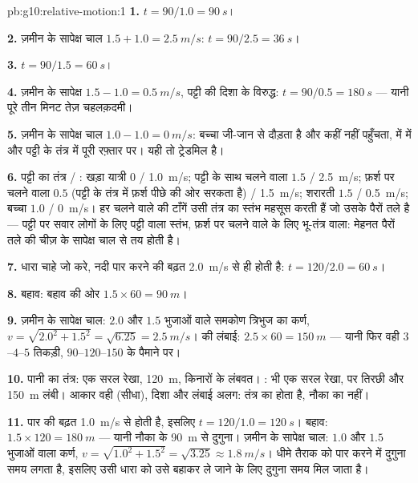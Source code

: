 \begin{solution}{pb:g10:relative-motion:1}
\textbf{1.} $t = 90/1.0 = \qty{90}{s}$।

\textbf{2.} ज़मीन के सापेक्ष चाल $1.5 + 1.0 = \qty{2.5}{m/s}$: $t = 90/2.5 = \qty{36}{s}$।

\textbf{3.} $t = 90/1.5 = \qty{60}{s}$।

\textbf{4.} ज़मीन के सापेक्ष $1.5 - 1.0 = \qty{0.5}{m/s}$, पट्टी की दिशा के विरुद्ध: $t = 90/0.5 = \qty{180}{s}$
--- यानी पूरे तीन मिनट तेज़ चहलक़दमी।

\textbf{5.} ज़मीन के सापेक्ष चाल $1.0 - 1.0 = \qty{0}{m/s}$: बच्चा जी-जान से दौड़ता है और
कहीं नहीं पहुँचता,  में  में और
पट्टी के तंत्र में पूरी रफ़्तार पर। यही तो ट्रेडमिल है।

\textbf{6.} पट्टी का तंत्र / : खड़ा यात्री
$0$ / \qty{1.0}{m/s}; पट्टी के साथ चलने वाला $1.5$ / \qty{2.5}{m/s}; फ़र्श पर
चलने वाला $0.5$ (पट्टी के तंत्र में फ़र्श पीछे की ओर सरकता है) /
\qty{1.5}{m/s}; शरारती $1.5$ / \qty{0.5}{m/s}; बच्चा $1.0$ / \qty{0}{m/s}। हर चलने वाले
की टाँगें उसी तंत्र का स्तंभ महसूस करती हैं जो उसके पैरों तले है ---
पट्टी पर सवार लोगों के लिए पट्टी वाला स्तंभ, फ़र्श पर चलने वाले के लिए
भू-तंत्र वाला: मेहनत पैरों तले की चीज़ के सापेक्ष चाल से तय होती है।

\textbf{7.} धारा चाहे जो करे, नदी पार करने की बढ़त \qty{2.0}{m/s} से ही होती है:
$t = 120/2.0 = \qty{60}{s}$।

\textbf{8.} बहाव: बहाव की ओर $1.5 \times 60 = \qty{90}{m}$।

\textbf{9.} ज़मीन के सापेक्ष चाल: $2.0$ और $1.5$ भुजाओं वाले समकोण
त्रिभुज का कर्ण, $v = \sqrt{2.0^2 + 1.5^2} = \sqrt{6.25}
= \qty{2.5}{m/s}$।  की लंबाई: $2.5 \times 60 = \qty{150}{m}$ --- यानी फिर
वही $3$--$4$--$5$ तिकड़ी, $90$--$120$--$150$ के पैमाने
पर।

\textbf{10.} पानी का तंत्र: एक सरल रेखा, \qty{120}{m}, किनारों के लंबवत।
: भी एक सरल रेखा, पर तिरछी और \qty{150}{m} लंबी। आकार
वही (सीधा), दिशा और लंबाई अलग:  तंत्र का होता है, नौका का
नहीं।

\textbf{11.} पार की बढ़त \qty{1.0}{m/s} से होती है, इसलिए $t = 120/1.0 = \qty{120}{s}$। बहाव:
$1.5 \times 120 = \qty{180}{m}$ --- यानी नौका के \qty{90}{m} से दुगुना। ज़मीन के सापेक्ष चाल:
$1.0$ और $1.5$ भुजाओं वाला कर्ण, $v = \sqrt{1.0^2 + 1.5^2} = \sqrt{3.25}
\approx \qty{1.8}{m/s}$। धीमे तैराक को पार करने में
दुगुना समय लगता है, इसलिए उसी धारा को उसे बहाकर ले जाने के लिए दुगुना
समय मिल जाता है।


\end{solution}
